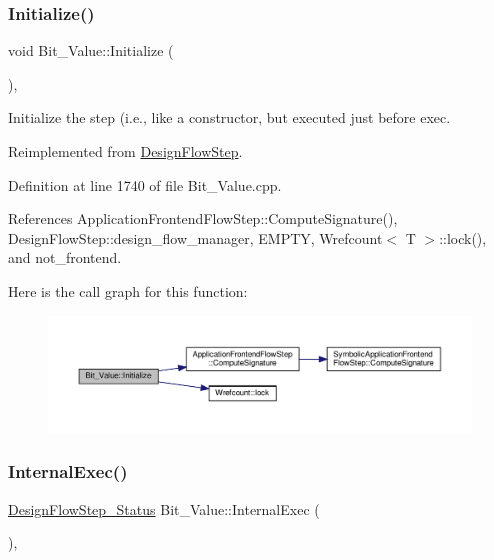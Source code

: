 \subsubsection{\texorpdfstring{Initialize()}{Initialize()}}
{\footnotesize\ttfamily void Bit\+\_\+\+Value\+::\+Initialize (\begin{DoxyParamCaption}{ }\end{DoxyParamCaption})\hspace{0.3cm}{\ttfamily [override]}, {\ttfamily [virtual]}}



Initialize the step (i.\+e., like a constructor, but executed just before exec. 



Reimplemented from \hyperlink{classDesignFlowStep_a44b50683382a094976e1d432a7784799}{Design\+Flow\+Step}.



Definition at line 1740 of file Bit\+\_\+\+Value.\+cpp.



References Application\+Frontend\+Flow\+Step\+::\+Compute\+Signature(), Design\+Flow\+Step\+::design\+\_\+flow\+\_\+manager, E\+M\+P\+TY, Wrefcount$<$ T $>$\+::lock(), and not\+\_\+frontend.

Here is the call graph for this function\+:
\nopagebreak
\begin{figure}[H]
\begin{center}
\leavevmode
\includegraphics[width=350pt]{df/d4b/classBit__Value_ad953c9d31beaef0358204674ef9308e5_cgraph}
\end{center}
\end{figure}
\mbox{\label{classBit__Value_afa7bcd5d1e9e4683bd7301de7a90e9b3}} 
\subsubsection{\texorpdfstring{Internal\+Exec()}{InternalExec()}}
{\footnotesize\ttfamily \hyperlink{design__flow__step_8hpp_afb1f0d73069c26076b8d31dbc8ebecdf}{Design\+Flow\+Step\+\_\+\+Status} Bit\+\_\+\+Value\+::\+Internal\+Exec (\begin{DoxyParamCaption}{ }\end{DoxyParamCaption})\hspace{0.3cm}{\ttfamily [override]}, {\ttfamily [virtual]}}



